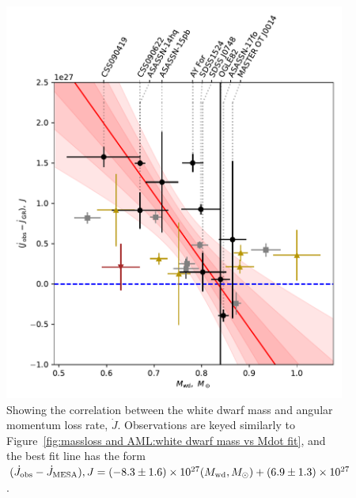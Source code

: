 \begin{figure}
    \centering
    \includegraphics[width=\textwidth]{figures/results/Mdot/Mwd_Jdot_ex.pdf}
    \caption{Showing the correlation between the white dwarf mass and angular momentum loss rate, $\dot J$. Observations are keyed similarly to Figure~\ref{fig:massloss and AML:white dwarf mass vs Mdot fit}, and the best fit line has the form $(\dot J_{\rm obs} - \dot J_{\rm MESA}), J = (-8.3\pm1.6) \times 10^{27}(M_{\rm wd}, M_\odot) + (6.9\pm1.3)\times10^{27}$.}
    \label{fig:massloss and AML:white dwarf mass vs Jdot fit}
\end{figure}



\clearpage
\newpage

